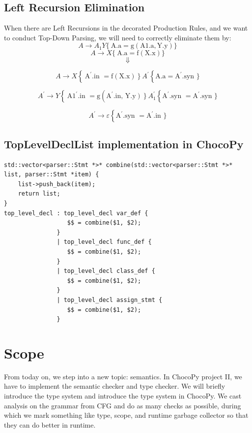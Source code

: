 \documentclass[a4paper]{exam}
\begin{document}
\subsection{Left Recursion Elimination}
When there are Left Recursions in the decorated Production Rules, and we want to conduct Top-Down Parsing, we will need to correctly eliminate them by:
$$A \rightarrow A_{1} Y\{\mathrm{~A} . \mathrm{a}=\mathrm{g}(\mathrm{A} 1 . \mathrm{a}, \mathrm{Y} . \mathrm{y})\}$$
$$A \rightarrow X\{\mathrm{~A} . \mathrm{a}=\mathrm{f}(\mathrm{X} . \mathrm{x})\}$$
$$\Downarrow$$

$$A \rightarrow X\left\{\mathrm{~A}^{\prime} .\right. \text{in }\left.=\mathrm{f}(\mathrm{X} . \mathrm{x})\right\} A^{\prime}\left\{\mathrm{A} . \mathrm{a}=\mathrm{A}^{\prime} .\right.\text{syn }\}$$

$$A^{\prime} \rightarrow Y\left\{\mathrm{~A} 1^{\prime} .\right.\text{in }=\mathrm{g}\left(\mathrm{A}^{\prime} .\right.\text{in, }\left.\left.\mathrm{Y} . \mathrm{y}\right)\right\} A_{1}^{\prime}\left\{\mathrm{A}^{\prime} .\right.\text{syn }=\mathrm{A}^{\prime} .\text{syn }\}$$

$$A^{\prime} \rightarrow \varepsilon\left\{\mathrm{A}^{\prime} .\right.\text{syn }=\mathrm{A}^{\prime} .\text{in }\}$$

\subsection{TopLevelDeclList implementation in ChocoPy}
\begin{verbatim}
std::vector<parser::Stmt *>* combine(std::vector<parser::Stmt *>* list, parser::Stmt *item) {
    list->push_back(item);
    return list;
}
top_level_decl : top_level_decl var_def {
                  $$ = combine($1, $2);
               }
               | top_level_decl func_def {
                  $$ = combine($1, $2);
               }
               | top_level_decl class_def {
                  $$ = combine($1, $2);
               }
               | top_level_decl assign_stmt {
                  $$ = combine($1, $2);
               }
\end{verbatim}

\section{Scope}
From today on, we step into a new topic: semantics. In ChocoPy project II, we have to implement the semantic checker and type checker. We will briefly introduce the type system and introduce the type system in ChocoPy. We cast analysis on the grammar from CFG and do as many checks as possible, during which we mark something like type, scope, and runtime garbage collector so that they can do better in runtime.
\end{document}
